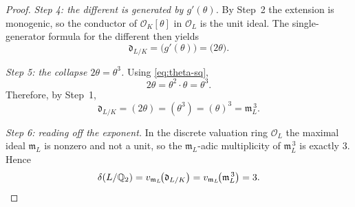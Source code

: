 \begin{proof}
\medskip
\noindent\emph{Step 4: the different is generated by $g'(\theta)$.}
By Step~2 the extension is monogenic, so the conductor of $\mathcal{O}_K[\theta]$
in $\mathcal{O}_L$ is the unit ideal. The single-generator formula for the
different then yields
\[
  \mathfrak{d}_{L/K}
  = \bigl(g'(\theta)\bigr)
  = \bigl(2\theta\bigr).
\]

\medskip
\noindent\emph{Step 5: the collapse $2\theta = \theta^3$.}
Using \eqref{eq:theta-sq},
\[
  2\theta = \theta^2\cdot\theta = \theta^3 .
\]
Therefore, by Step~1,
\[
  \mathfrak{d}_{L/K} = (2\theta) = (\theta^3) = (\theta)^3 = \mathfrak{m}_L^{\,3}.
\]

\medskip
\noindent\emph{Step 6: reading off the exponent.}
In the discrete valuation ring $\mathcal{O}_L$ the maximal ideal $\mathfrak{m}_L$
is nonzero and not a unit, so the $\mathfrak{m}_L$-adic multiplicity of
$\mathfrak{m}_L^{\,3}$ is exactly $3$. Hence
\[
  \delta(L/\mathbb{Q}_2)
  = v_{\mathfrak{m}_L}\!\bigl(\mathfrak{d}_{L/K}\bigr)
  = v_{\mathfrak{m}_L}\!\bigl(\mathfrak{m}_L^{\,3}\bigr)
  = 3 . \qedhere
\]
\end{proof}